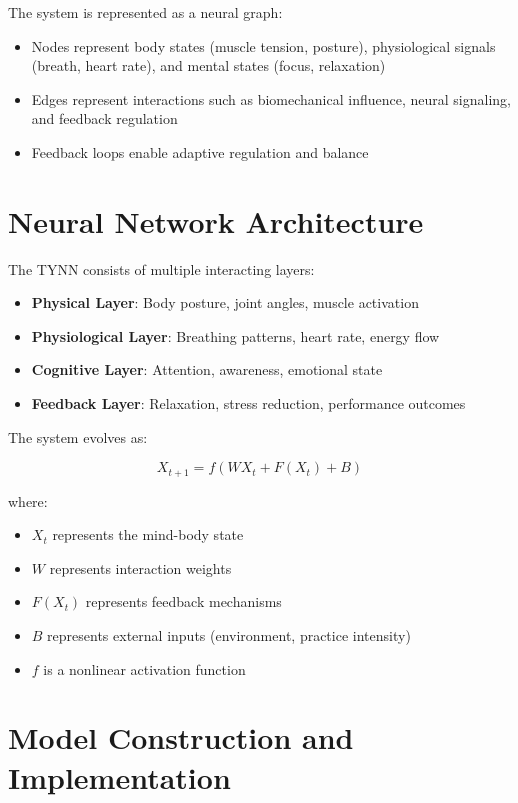 \documentclass[12pt]{article}
\begin{document}
The system is represented as a neural graph:

\begin{itemize}
\item Nodes represent body states (muscle tension, posture), physiological signals (breath, heart rate), and mental states (focus, relaxation)
\item Edges represent interactions such as biomechanical influence, neural signaling, and feedback regulation
\item Feedback loops enable adaptive regulation and balance
\end{itemize}

\section{Neural Network Architecture}

The TYNN consists of multiple interacting layers:

\begin{itemize}
\item \textbf{Physical Layer}: Body posture, joint angles, muscle activation
\item \textbf{Physiological Layer}: Breathing patterns, heart rate, energy flow
\item \textbf{Cognitive Layer}: Attention, awareness, emotional state
\item \textbf{Feedback Layer}: Relaxation, stress reduction, performance outcomes
\end{itemize}

The system evolves as:

\[
X_{t+1} = f(WX_t + F(X_t) + B)
\]

where:
\begin{itemize}
\item $X_t$ represents the mind-body state
\item $W$ represents interaction weights
\item $F(X_t)$ represents feedback mechanisms
\item $B$ represents external inputs (environment, practice intensity)
\item $f$ is a nonlinear activation function
\end{itemize}

\section{Model Construction and Implementation}
\end{document}
